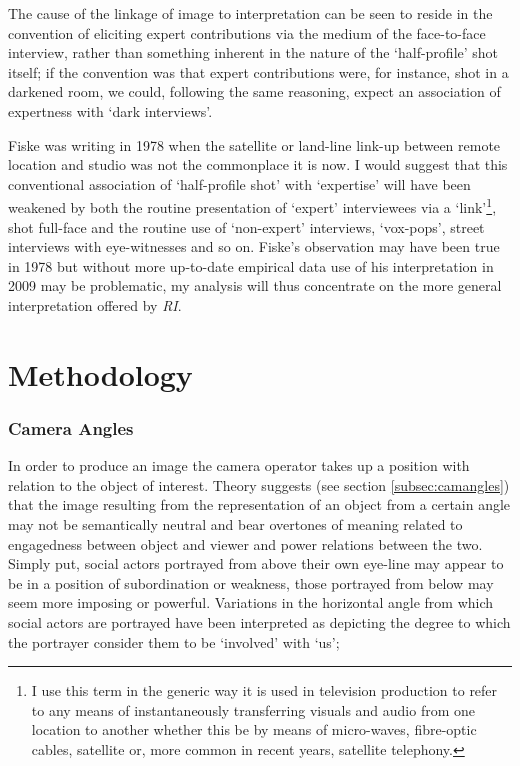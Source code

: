 The cause of the linkage of image to interpretation can be seen to reside in the convention of eliciting expert contributions via the medium of the face-to-face interview, rather than something inherent in the nature of the `half-profile' shot itself; if the convention was that expert contributions were, for instance, shot in a darkened room, we could, following the same reasoning, expect an association of expertness with `dark interviews'. 

Fiske was writing in 1978 when the satellite or land-line link-up between remote location and studio was not the commonplace it is now. I would suggest that this conventional association of `half-profile shot' with `expertise' will have been weakened by both the routine presentation of `expert' interviewees via a `link'\footnote{I use this term in the generic way it is used in television production to refer to any means of instantaneously transferring visuals and audio from one location to another whether this be by means of micro-waves, fibre-optic cables, satellite or, more common in recent years, satellite telephony.}, shot full-face and the routine use of `non-expert' interviews, `vox-pops', street interviews with eye-witnesses and so on. Fiske's observation may have been true in 1978 but without more up-to-date empirical data use of his interpretation in 2009 may be problematic, my analysis will thus concentrate on the more general interpretation offered by \emph{RI}.


\section{Methodology}

\subsubsection{Camera Angles}
In order to produce an image the camera operator takes up a position with relation to the object of interest. Theory suggests (see section \ref{subsec:camangles}) that the image resulting from the representation of an object from a certain angle may not be semantically neutral and bear overtones of meaning related to engagedness between object and viewer and power relations between the two. Simply put, social actors portrayed from above their own eye-line may appear to be in a position of subordination or weakness, those portrayed from below may seem more imposing or powerful. Variations in the horizontal angle from which social actors are portrayed have been interpreted as depicting the degree to which the portrayer consider them to be `involved' with `us';

